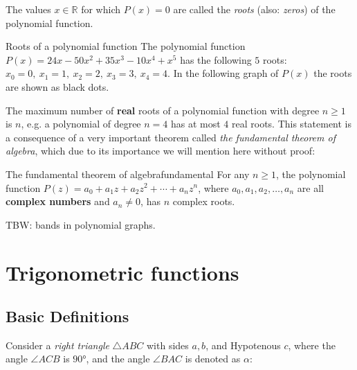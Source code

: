 The values $x\in\mathbb{R}$ for which $P(x)=0$ are called the \emph{roots} (also: \emph{zeros}) of the polynomial function.

\begin{example}{Roots of a polynomial function}{}
	The polynomial function $P(x) = 24x - 50x^{2} + 35x^{3} - 10x^{4} + x^{5}$ has the following $5$ roots: $x_{0}=0,\ x_{1}=1,\ x_{2}=2,\ x_{3}=3,\ x_{4}=4$. In the following graph of $P(x)$ the roots are shown as black dots.
	\begin{figure}[H]
		\centering
	\end{figure}
\end{example}

The maximum number of \textbf{real} roots of a polynomial function with degree $n\geq1$ is $n$, e.g. a polynomial of degree $n=4$ has at most $4$ real roots. This statement is a consequence of a very important theorem called \emph{the fundamental theorem of algebra}, which due to its importance we will mention here without proof:

\begin{theorem}{The fundamental theorem of algebra}{fundamental}
	For any $n\geq1$, the polynomial function $P(z)=a_{0}+a_{1}z+a_{2}z^{2}+\cdots+a_{n}z^{n}$, where $a_{0},a_{1},a_{2},\dots,a_{n}$ are all \textbf{complex numbers} and $a_{n}\neq0$, has $n$ complex roots.
\end{theorem}

TBW: bands in polynomial graphs.

\section{Trigonometric functions}
\subsection{Basic Definitions}
Consider a \emph{right triangle} $\triangle ABC$ with sides $a,b$, and Hypotenous $c$, where the angle $\angle ACB$ is $\ang{90}$, and the angle $\angle BAC$ is denoted as $\alpha$:

